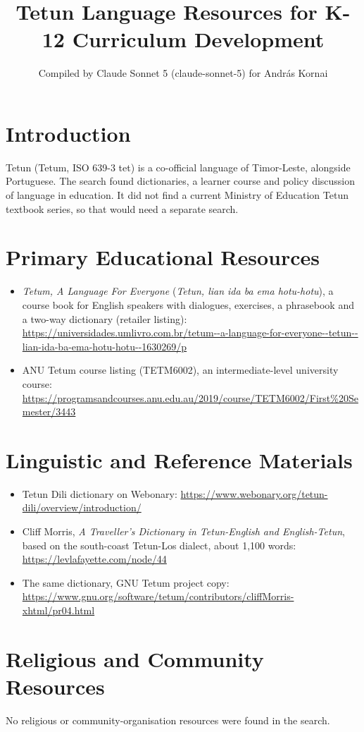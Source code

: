 \documentclass[12pt]{article}
\title{Tetun Language Resources for K-12 Curriculum Development}
\author{Compiled by Claude Sonnet 5 (claude-sonnet-5) for Andr\'as Kornai}
\date{}
\begin{document}
\maketitle

\section{Introduction}
Tetun (Tetum, ISO 639-3 tet) is a co-official language of Timor-Leste, alongside Portuguese. The search found dictionaries, a learner course and policy discussion of language in education. It did not find a current Ministry of Education Tetun textbook series, so that would need a separate search.

\section{Primary Educational Resources}
\begin{itemize}
\item \emph{Tetum, A Language For Everyone} (\emph{Tetun, lian ida ba ema hotu-hotu}), a course book for English speakers with dialogues, exercises, a phrasebook and a two-way dictionary (retailer listing): \url{https://universidades.umlivro.com.br/tetum--a-language-for-everyone--tetun--lian-ida-ba-ema-hotu-hotu--1630269/p}
\item ANU Tetum course listing (TETM6002), an intermediate-level university course: \url{https://programsandcourses.anu.edu.au/2019/course/TETM6002/First%20Semester/3443}
\end{itemize}

\section{Linguistic and Reference Materials}
\begin{itemize}
\item Tetun Dili dictionary on Webonary: \url{https://www.webonary.org/tetun-dili/overview/introduction/}
\item Cliff Morris, \emph{A Traveller's Dictionary in Tetun-English and English-Tetun}, based on the south-coast Tetun-Los dialect, about 1,100 words: \url{https://levlafayette.com/node/44}
\item The same dictionary, GNU Tetum project copy: \url{https://www.gnu.org/software/tetum/contributors/cliffMorris-xhtml/pr04.html}
\end{itemize}

\section{Religious and Community Resources}
No religious or community-organisation resources were found in the search.
\end{document}
